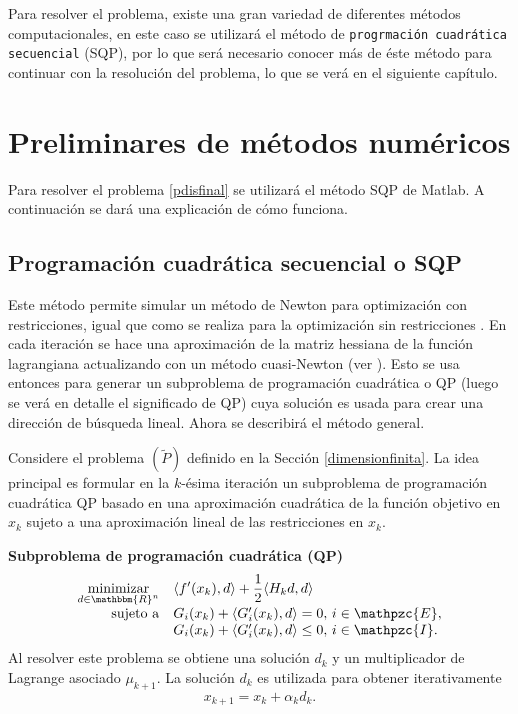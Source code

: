 \documentclass[a4paper,10pt]{book}
\newcommand{\R}{\mathbbm{R}}
\newcommand{\Rn}{\R^n}
\newcommand{\cI}{\mathpzc{I}}
\newcommand{\cE}{\mathpzc{E}}
\newcommand{\la}{\langle}
\newcommand{\ra}{\rangle}
\begin{document}



Para resolver el problema, existe una gran variedad de diferentes métodos computacionales, en este caso se utilizará el método de \texttt{progrmación cuadrática secuencial} (SQP), por lo que será necesario conocer más de éste método para continuar con la resolución del problema, lo que se verá en el siguiente capítulo.

\chapter{Preliminares de métodos numéricos}

Para resolver el problema \eqref{pdisfinal} se utilizará el método SQP de Matlab. A continuación se dará una explicación de cómo funciona.
\section{Programación cuadrática secuencial o SQP}
Este método permite simular un método de Newton para optimización con restricciones, igual que como se realiza para la optimización sin restricciones \cite[Section 1.4.]{bertsekas1999nonlinear}. En cada iteración se hace una aproximación de la matriz hessiana de la función lagrangiana actualizando con un método cuasi-Newton (ver \cite[Section 1.7.]{bertsekas1999nonlinear}). Esto se usa entonces para generar un subproblema de programación cuadrática o QP (luego se verá en detalle el significado de QP) cuya solución es usada para crear una dirección de búsqueda lineal. Ahora se describirá el método general.

Considere el problema $(\tilde{P})$ definido en la Sección \ref{dimensionfinita}. La idea principal es formular en la $k$-ésima iteración un subproblema de programación cuadrática QP basado en una aproximación cuadrática de la función objetivo en $x_k$ sujeto a una aproximación lineal de las restricciones en $x_k$.

\textbf{Subproblema de programación cuadrática (QP)}
\begin{equation}\label{QP}
\begin{array}{rl}
\displaystyle \mathop{\mathrm{minimizar}}_{d\in\Rn} & \displaystyle \la f'(x_k), d\ra + \frac{1}{2}\la H_kd,d\ra \\
\mathrm{sujeto \ a} & G_i(x_k)+\la G_i'(x_k),d\ra =0, \, i\in \cE,\\
                    & G_i(x_k)+\la G_i'(x_k),d\ra \leq 0, \, i\in \cI.
\end{array}
\end{equation}
Al resolver este problema se obtiene una solución $d_k$ y un multiplicador de Lagrange asociado $\mu_{k+1}$.
La solución $d_k$ es utilizada para obtener iterativamente $$x_{k+1}=x_k+\alpha_kd_k.$$ 
\end{document}
